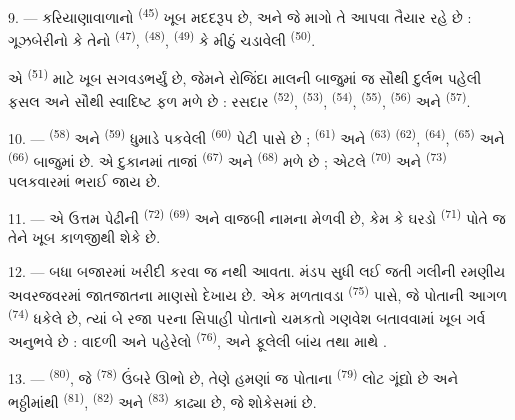 9. --- કરિયાણાવાળાનો  \textsuperscript{(45)} ખૂબ
મદદરૂપ છે, અને જે માગો તે આપવા તૈયાર રહે છે : ગૂઝબેરીનો કે તેનો
 \textsuperscript{(47)}, 
\textsuperscript{(48)},  \textsuperscript{(49)} કે
મીઠું ચડાવેલી  \textsuperscript{(50)}.

એ  \textsuperscript{(51)} માટે ખૂબ સગવડભર્યું છે,
જેમને રોજિંદા માલની બાજુમાં જ સૌથી દુર્લભ પહેલી ફસલ અને સૌથી સ્વાદિષ્ટ
ફળ મળે છે : રસદાર  \textsuperscript{(52)},
 \textsuperscript{(53)}, 
\textsuperscript{(54)},  \textsuperscript{(55)},
 \textsuperscript{(56)} અને 
\textsuperscript{(57)}.

\VUsaut{4.0mm}
\VUsaut{3.0mm}

10. ---  \textsuperscript{(58)} અને 
\textsuperscript{(59)} ધુમાડે પકવેલી 
\textsuperscript{(60)} પેટી પાસે છે ; 
\textsuperscript{(61)} અને  \textsuperscript{(63)}
 \textsuperscript{(62)}, 
\textsuperscript{(64)},  \textsuperscript{(65)}
અને  \textsuperscript{(66)} બાજુમાં છે. એ દુકાનમાં
તાજાં  \textsuperscript{(67)} અને 
\textsuperscript{(68)} મળે છે ; એટલે 
\textsuperscript{(70)} અને 
\textsuperscript{(73)} પલકવારમાં ભરાઈ જાય છે.

11. --- એ ઉત્તમ પેઢીની  \textsuperscript{(72)}
 \textsuperscript{(69)} અને  વાજબી
નામના મેળવી છે, કેમ કે ઘરડો  \textsuperscript{(71)}
પોતે જ તેને ખૂબ કાળજીથી શેકે છે.

\VUsaut{4.0mm}
\VUsaut{3.0mm}

12. --- બધા બજારમાં ખરીદી કરવા જ નથી આવતા. મંડપ સુધી લઈ જતી ગલીની
રમણીય અવરજવરમાં જાતજાતના માણસો દેખાય છે. એક મળતાવડા  \textsuperscript{(75)} પાસે, જે પોતાની આગળ 
\textsuperscript{(74)} ધકેલે છે, ત્યાં બે રજા પરના સિપાહી પોતાનો ચમકતો
ગણવેશ બતાવવામાં ખૂબ ગર્વ અનુભવે છે : વાદળી  અને
 પહેરેલો  \textsuperscript{(76)},
અને ફૂલેલી બાંય તથા માથે  .

13. ---  \textsuperscript{(80)}, જે  \textsuperscript{(78)} ઉંબરે ઊભો છે, તેણે હમણાં જ પોતાના
 \textsuperscript{(79)} લોટ ગૂંદ્યો છે અને ભઠ્ઠીમાંથી
 \textsuperscript{(81)}, 
\textsuperscript{(82)} અને  \textsuperscript{(83)}
કાઢ્યા છે, જે શોકેસમાં છે.

